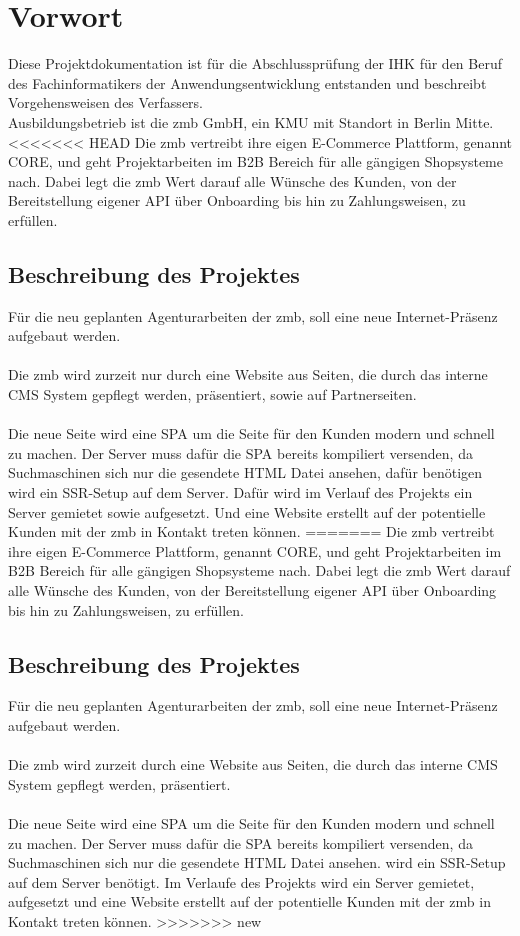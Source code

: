 \documentclass[11pt,a4paper]{article}
\begin{document}
\section{Vorwort}
Diese Projektdokumentation ist für die Abschlussprüfung der IHK für den Beruf des Fachinformatikers der Anwendungsentwicklung entstanden und beschreibt Vorgehensweisen des Verfassers.\\
Ausbildungsbetrieb ist die zmb GmbH, ein \acs{KMU} mit Standort in Berlin Mitte.
<<<<<<< HEAD
Die zmb vertreibt ihre eigen E-Commerce Plattform, genannt CORE, und geht Projektarbeiten im \acs{B2B} Bereich für alle gängigen Shopsysteme nach.
Dabei legt die zmb Wert darauf alle Wünsche des Kunden, von der Bereitstellung eigener API über Onboarding bis hin zu Zahlungsweisen, zu erfüllen.
\subsection{Beschreibung des Projektes}
Für die neu geplanten Agenturarbeiten der zmb, soll eine neue Internet-Präsenz aufgebaut werden.\\\\
Die zmb wird zurzeit nur durch eine Website aus Seiten, die durch das interne CMS System gepflegt werden, präsentiert, sowie auf Partnerseiten.\\\\
Die neue Seite wird eine \acs{SPA} um die Seite für den Kunden modern und schnell zu machen.
Der Server muss dafür die \acs{SPA} bereits kompiliert versenden, da Suchmaschinen sich nur die gesendete HTML Datei ansehen, dafür benötigen wird ein \acs{SSR}-Setup auf dem Server.
Dafür wird im Verlauf des Projekts ein Server gemietet sowie aufgesetzt. Und eine Website erstellt auf der potentielle Kunden mit der zmb in Kontakt treten können.
=======
Die zmb vertreibt ihre eigen E-Commerce Plattform, genannt CORE, und geht Projektarbeiten im \acs{B2B} Bereich für alle gängigen Shopsysteme nach.
Dabei legt die zmb Wert darauf alle Wünsche des Kunden, von der Bereitstellung eigener API über Onboarding bis hin zu Zahlungsweisen, zu erfüllen.
\subsection{Beschreibung des Projektes}
Für die neu geplanten Agenturarbeiten der zmb, soll eine neue Internet-Präsenz aufgebaut werden.\\\\
Die zmb wird zurzeit durch eine Website aus Seiten, die durch das interne CMS System gepflegt werden, präsentiert.\\\\
Die neue Seite wird eine \acs{SPA} um die Seite für den Kunden modern und schnell zu machen.
Der Server muss dafür die \acs{SPA} bereits kompiliert versenden, da Suchmaschinen sich nur die gesendete HTML Datei ansehen. wird ein \acs{SSR}-Setup auf dem Server benötigt.
Im Verlaufe des Projekts wird ein Server gemietet, aufgesetzt und eine Website erstellt auf der potentielle Kunden mit der zmb in Kontakt treten können.
>>>>>>> new
\end{document}
